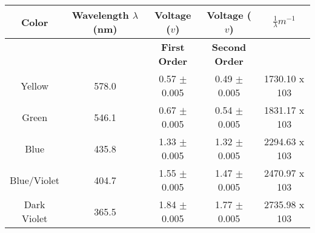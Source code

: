 

{}

\begin{table}[H]
    \centering
    \begin{tabular}{|c|c|c|c|c|}
    \hline
    \hline
        Color & Wavelength $\lambda$ (nm) & Voltage ($v$) & Voltage ($v$) & $\frac{1}{\lambda}m^{-1}$ \\ \hline
        ~ & ~ & \textbf{First Order} & \textbf{Second Order} & ~ \\ 
        \hline
        \hline
        Yellow & 578.0  & 0.57 $\pm$ 0.005 & 0.49 $\pm$ 0.005 & 1730.10 x 103 \\ 
        \hline
        Green & 546.1  & 0.67 $\pm$ 0.005 & 0.54 $\pm$ 0.005 & 1831.17 x 103 \\ 
        \hline
        Blue & 435.8  & 1.33 $\pm$ 0.005 & 1.32 $\pm$ 0.005 & 2294.63 x 103 \\ \hline
        Blue/Violet & 404.7  & 1.55 $\pm$ 0.005 & 1.47 $\pm$ 0.005 & 2470.97 x 103 \\ 
        \hline
        Dark Violet & 365.5  & 1.84 $\pm$ 0.005 & 1.77 $\pm$ 0.005 & 2735.98 x 103 \\ 
        \hline
        \hline
    \end{tabular}
\end{table}






